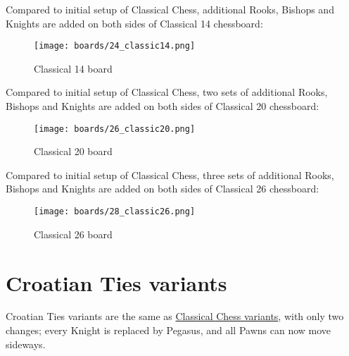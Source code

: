 Compared to initial setup of Classical Chess, additional Rooks, Bishops and Knights
are added on both sides of Classical 14 chessboard:

\noindent
\begin{figure}[h]
\texttt{[image: boards/24\_classic14.png]}
\caption{Classical 14 board}
\label{fig:24_classic14}
\end{figure}

\vfill{}

\clearpage %

Compared to initial setup of Classical Chess, two sets of additional Rooks, Bishops
and Knights are added on both sides of Classical 20 chessboard:

\noindent
\begin{figure}[h]
\texttt{[image: boards/26\_classic20.png]}
\caption{Classical 20 board}
\label{fig:26_classic20}
\end{figure}

\vfill{}

\clearpage %

Compared to initial setup of Classical Chess, three sets of additional Rooks, Bishops
and Knights are added on both sides of Classical 26 chessboard:

\noindent
\begin{figure}[h]
\texttt{[image: boards/28\_classic26.png]}
\caption{Classical 26 board}
\label{fig:28_classic26}
\end{figure}

\vfill{}

\clearpage %

\section*{Croatian Ties variants}
\label{sec:Simple variants/Croatian Ties variants}

Croatian Ties variants are the same as
\hyperref[sec:Simple variants/Classical Chess variants]{Classical Chess variants},
with only two changes; every Knight is replaced by Pegasus, and all Pawns can now
move sideways.


